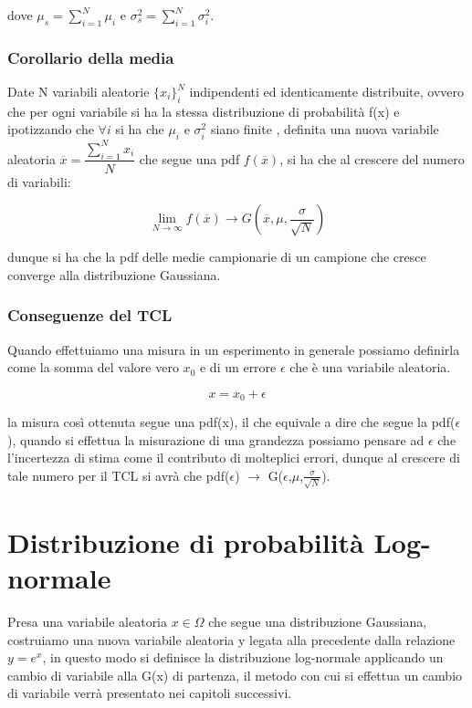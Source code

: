 \documentclass[11pt,a4paper]{book}
\begin{document}
dove $\mu_s =\sum_{i=1}^N \mu_i$ e $\sigma_s^2 = \sum_{i=1}^N \sigma^2_i$.

\subsubsection{Corollario della media}

Date N variabili aleatorie $\{x_{i}\}_{i}^N$ indipendenti ed identicamente distribuite, ovvero che per ogni variabile si ha la stessa distribuzione di probabilit\`{a} f(x) e ipotizzando che $\forall i$ si ha che $\mu_i$ e $\sigma_i^2$ siano finite , definita una nuova variabile aleatoria $\overline{x} = \dfrac{\sum_{i=1}^N x_{i}}{N}$ che segue una pdf $f(\overline{x})$, si ha che al crescere del numero di variabili:

\begin{equation*}
	\lim_{N \rightarrow \infty} f(\overline{x}) \rightarrow G(\overline{x},\mu,\frac{\sigma}{\sqrt{N}})
\end{equation*}

dunque si ha che la pdf delle medie campionarie di un campione che cresce converge alla distribuzione Gaussiana.


\subsubsection{Conseguenze del TCL}

 Quando effettuiamo una misura in un esperimento in generale possiamo definirla come la somma del valore vero $x_0$ e di un errore $\epsilon$ che \`{e} una variabile aleatoria.
 
 \begin{equation*}
 	x = x_0 + \epsilon
 \end{equation*}

la misura cos\`{i} ottenuta segue una pdf(x), il che equivale a dire che segue la pdf($\epsilon$), quando si effettua la misurazione di una grandezza possiamo pensare ad $\epsilon$ che l'incertezza di stima come il contributo di molteplici errori, dunque al crescere di tale numero per il TCL si avr\`{a} che pdf($\epsilon$) $\rightarrow$ G($\epsilon$,$\mu$,$\frac{\sigma}{\sqrt{N}}$).

\section{Distribuzione di probabilit\`{a} Log-normale}

Presa una variabile aleatoria $x \in \Omega $ che segue una distribuzione Gaussiana, costruiamo una nuova variabile aleatoria y legata alla precedente dalla relazione $y = e^x$, in questo modo si definisce la distribuzione log-normale applicando un cambio di variabile alla G(x) di partenza, il metodo con cui si effettua un cambio di variabile verr\`{a} presentato nei capitoli successivi.
\end{document}
